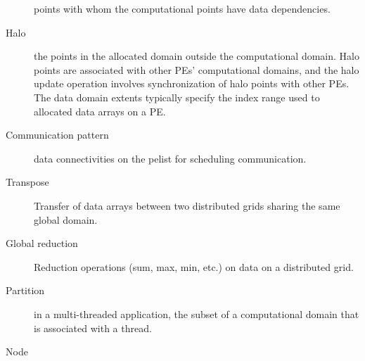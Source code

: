 \begin{description}
  points with whom the computational points have data dependencies.
\item[Halo] the points in the allocated domain outside the
  computational domain. Halo points are associated with other PEs'
  computational domains, and the halo update operation involves
  synchronization of halo points with other PEs. The data domain
  extents typically specify the index range used to allocated data
  arrays on a PE.
\item[Communication pattern] data connectivities on the pelist for
scheduling communication.
\item[Transpose] Transfer of data arrays between two distributed grids
  sharing the same global domain.
\item[Global reduction] Reduction operations (sum, max, min, etc.) on
  data on a distributed grid.
\item[Partition] in a multi-threaded application, the subset of a
  computational domain that is associated with a thread.
\item[Node]



\end{description}




